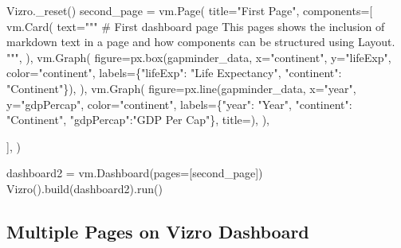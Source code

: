 \documentclass[
  letterpaper,
  DIV=11,
  numbers=noendperiod]{scrreprt}
\newenvironment{Shaded}{\begin{snugshade}}{\end{snugshade}}
\newcommand{\NormalTok}[1]{\textcolor[rgb]{0.00,0.23,0.31}{#1}}
\newcommand{\OperatorTok}[1]{\textcolor[rgb]{0.37,0.37,0.37}{#1}}
\newcommand{\StringTok}[1]{\textcolor[rgb]{0.13,0.47,0.30}{#1}}
\begin{document}
\begin{Shaded}
\begin{Highlighting}[]
\NormalTok{Vizro.\_reset()}
\NormalTok{second\_page }\OperatorTok{=}\NormalTok{ vm.Page(}
\NormalTok{    title}\OperatorTok{=}\StringTok{"First Page"}\NormalTok{,}
\NormalTok{    components}\OperatorTok{=}\NormalTok{[}
\NormalTok{        vm.Card(}
\NormalTok{            text}\OperatorTok{=}\StringTok{"""}
\StringTok{                \# First dashboard page}
\StringTok{                This pages shows the inclusion of markdown text in a page and how components}
\StringTok{                can be structured using Layout.}
\StringTok{            """}\NormalTok{,}
\NormalTok{        ),}
\NormalTok{        vm.Graph(}
\NormalTok{            figure}\OperatorTok{=}\NormalTok{px.box(gapminder\_data, x}\OperatorTok{=}\StringTok{"continent"}\NormalTok{, y}\OperatorTok{=}\StringTok{"lifeExp"}\NormalTok{, color}\OperatorTok{=}\StringTok{"continent"}\NormalTok{,}
\NormalTok{                            labels}\OperatorTok{=}\NormalTok{\{}\StringTok{"lifeExp"}\NormalTok{: }\StringTok{"Life Expectancy"}\NormalTok{, }\StringTok{"continent"}\NormalTok{: }\StringTok{"Continent"}\NormalTok{\}),}
\NormalTok{        ),}
\NormalTok{        vm.Graph(}
\NormalTok{            figure}\OperatorTok{=}\NormalTok{px.line(gapminder\_data, x}\OperatorTok{=}\StringTok{"year"}\NormalTok{, y}\OperatorTok{=}\StringTok{"gdpPercap"}\NormalTok{, color}\OperatorTok{=}\StringTok{"continent"}\NormalTok{,}
\NormalTok{                            labels}\OperatorTok{=}\NormalTok{\{}\StringTok{"year"}\NormalTok{: }\StringTok{"Year"}\NormalTok{, }\StringTok{"continent"}\NormalTok{: }\StringTok{"Continent"}\NormalTok{,}
                            \StringTok{"gdpPercap"}\NormalTok{:}\StringTok{"GDP Per Cap"}\NormalTok{\}, title}\OperatorTok{=}\StringTok{\textquotesingle{}\textquotesingle{}}\NormalTok{),}
\NormalTok{        ),}

\NormalTok{    ],}
\NormalTok{)}

\NormalTok{dashboard2 }\OperatorTok{=}\NormalTok{ vm.Dashboard(pages}\OperatorTok{=}\NormalTok{[second\_page])}
\NormalTok{Vizro().build(dashboard2).run()}
\end{Highlighting}
\end{Shaded}

\subsection{Multiple Pages on Vizro
Dashboard}\label{multiple-pages-on-vizro-dashboard}
\end{document}
